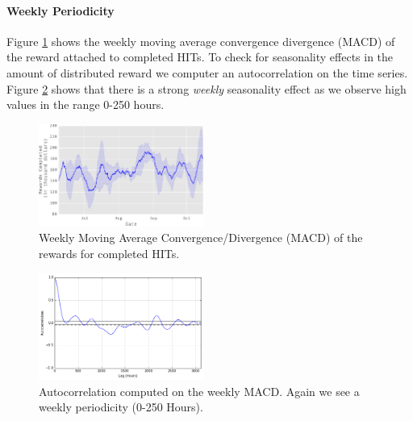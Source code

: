 \paragraph{Weekly Periodicity}
Figure \ref{fig:mac} shows the weekly moving average convergence divergence (MACD) of the reward attached to completed HITs. To check for seasonality effects in the amount of distributed reward we computer an autocorrelation on the time series. Figure \ref{fig:autocorrelation2} shows that there is a strong \emph{weekly} seasonality effect as we observe high values in the range 0-250 hours.
\begin{figure}[tb]
	\centering
		\includegraphics[width=0.48\textwidth]{figures/mac}
	\caption{Weekly Moving Average Convergence/Divergence (MACD) of the rewards for completed HITs.}
	\label{fig:mac}
\end{figure}
\begin{figure}[tb]
	\centering
		\includegraphics[width=0.48\textwidth]{figures/autocorrelation2}
	\caption{Autocorrelation computed on the weekly MACD. Again we see a weekly periodicity (0-250 Hours).}
	\label{fig:autocorrelation2}
\end{figure}